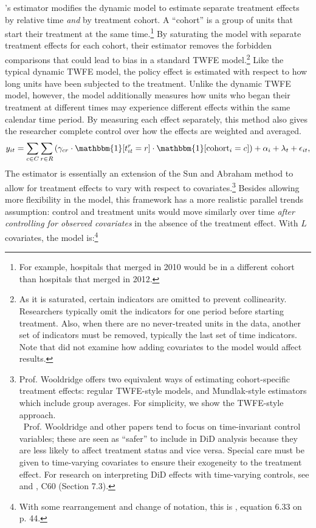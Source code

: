 \documentclass[12pt]{article}
\begin{document}
\citet{sunabr2021a}’s estimator modifies the dynamic model to estimate separate treatment effects by relative time \textit{and} by treatment cohort. A “cohort” is a group of units that start their treatment at the same time.\footnote{For example, hospitals that merged in 2010 would be in a different cohort than hospitals that merged in 2012.}  By saturating the model with separate treatment effects for each cohort, their estimator removes the forbidden comparisons that could lead to bias in a standard TWFE model.\footnote{As it is saturated, certain indicators are omitted to prevent collinearity. Researchers typically omit the indicators for one period before starting treatment. Also, when there are no never-treated units in the data, another set of indicators must be removed, typically the last set of time indicators. Note that \citet{sunabr2021a} did not examine how adding covariates to the model would affect results.} Like the typical dynamic TWFE model, the policy effect is estimated with respect to how long units have been subjected to the treatment. Unlike the dynamic TWFE model, however, the \citet{sunabr2021a} model additionally measures how units who began their treatment at different times may experience different effects within the same calendar time period. By measuring each effect separately, this method also gives the researcher complete control over how the effects are weighted and averaged.
\begin{equation}
    y_{it} = \sum_{c\in C}\sum_{r\in R}\left(\gamma_{cr}\cdot\mathbbm{1}[t^r_{it}=r]\cdot \mathbbm{1}[\text{cohort}_i=c]\right) + \alpha_i + \lambda_t + \epsilon_{it},
\end{equation}
The \citet{wooldridge2021two} estimator is essentially an extension of the Sun and Abraham method to allow for treatment effects to vary with respect to covariates.\footnote{Prof. Wooldridge offers two equivalent ways of estimating cohort-specific treatment effects: regular TWFE-style models, and Mundlak-style estimators which include group averages. For simplicity, we show the TWFE-style approach. \\\ Prof. Wooldridge and other papers tend to focus on time-invariant control variables; these are seen as “safer” to include in DiD analysis because they are less likely to affect treatment status and vice versa. Special care must be given to time-varying covariates to ensure their exogeneity to the treatment effect. For research on interpreting DiD effects with time-varying controls, see \citet{caetano2023} and \citet{wooldridge2023nonlinear}, C60 (Section 7.3).} Besides allowing more flexibility in the model, this framework has a more realistic parallel trends assumption: control and treatment units would move similarly over time \textit{after controlling for observed covariates} in the absence of the treatment effect. With $L$ covariates, the model is:\footnote{With some rearrangement and change of notation, this is \citet{wooldridge2021two}, equation 6.33 on p. 44.}
\end{document}
